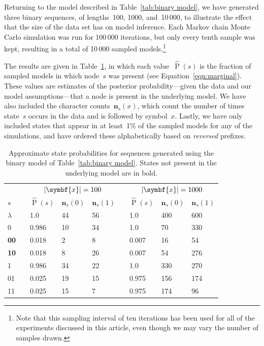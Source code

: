 \documentclass[11pt,a4paper]{article}
\newcommand\ub[1]{\symbf{#1}}                 %
\DeclareMathOperator\Pb{P}                    %
\DeclarePairedDelimiter\abs{\lvert}{\rvert}   %
\begin{document}
Returning to the model described in Table~\ref{tab:binary model}, we have
generated three binary sequences, of lengths~100, 1000, and~10\,000, to
illustrate the effect that the size of the data set has on model inference. Each
Markov chain Monte Carlo simulation was run for 100\,000 iterations, but only
every tenth sample was kept, resulting in a total of 10\,000 sampled
models.\footnote{Note that this sampling interval of ten iterations has been
used for all of the experiments discussed in this article, even though we may
vary the number of samples drawn.}

The results are given in Table~\ref{tab:binary inference}, in which each
value~\(\hat{\Pb}(s)\) is the fraction of sampled models in which node~\(s\) was
present (see Equation~\ref{eqn:marginal}). These values are estimates of the
posterior probability---given the data and our model assumptions---that a node
is present in the underlying model. We have also included the character
counts~\(\ub{n}_s(x)\), which count the number of times state~\(s\) occurs in
the data and is followed by symbol~\(x\). Lastly, we have only included states
that appear in at least~1\% of the sampled models for any of the simulations,
and have ordered these alphabetically based on \emph{reversed} prefixes.
%
\begin{table}[htbp]
\centering
\begin{tabular}{lclllclll}
  \toprule
  && \multicolumn{3}{c}{\(\abs{\ub{x}} = 100\)}
  && \multicolumn{3}{c}{\(\abs{\ub{x}} = 1000\)} \\
  \cmidrule{3-5} \cmidrule{7-9}
  \(s\) && \(\hat{\Pb}(s)\) & \(\ub{n}_s(0)\) & \(\ub{n}_s(1)\)
        && \(\hat{\Pb}(s)\) & \(\ub{n}_s(0)\) & \(\ub{n}_s(1)\) \\
  \midrule
  \(\lambda\) && 1.0   & 44 & 56 && 1.0   & 400 & 600 \\
  0           && 0.986 & 10 & 34 && 1.0   & 70  & 330 \\
  \textbf{00} && 0.018 & 2  & 8  && 0.007 & 16  & 54  \\
  \textbf{10} && 0.018 & 8  & 26 && 0.007 & 54  & 276 \\
  1           && 0.986 & 34 & 22 && 1.0   & 330 & 270 \\
  01          && 0.025 & 19 & 15 && 0.975 & 156 & 174 \\
  11          && 0.025 & 15 & 7  && 0.975 & 174 & 96  \\
  \bottomrule
\end{tabular}
\caption{Approximate state probabilities for sequences generated using the
  binary model of Table~\ref{tab:binary model}. States not present in the
  underlying model are in bold.}
\label{tab:binary inference}
\end{table}
\end{document}
